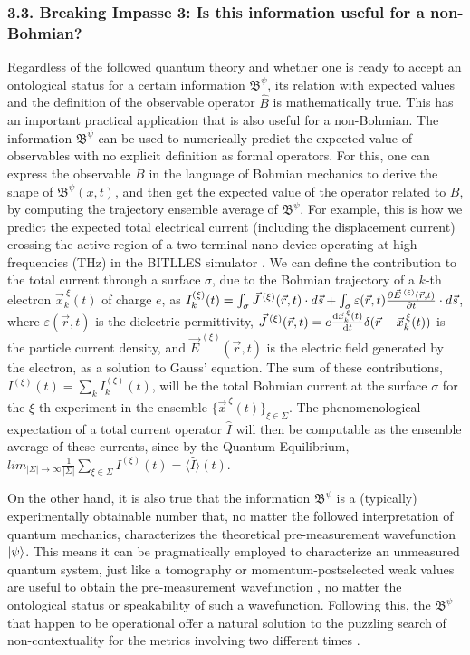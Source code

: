 \documentclass[11pt, a4paper]{article} %
\newcommand{\B}{\mathfrak{B}}
\begin{document}
\subsubsection*{3.3. Breaking Impasse 3: Is this information useful for a non-Bohmian?}
\vspace{-0.15cm}
Regardless of the followed quantum theory and whether one is ready to accept an ontological status for a certain information $\B^\psi$, its relation with expected values and the definition of the observable operator $\hat{B}$ is mathematically true. This has an important practical application that is also useful for a non-Bohmian. The information $\B^\psi$ can be used to numerically predict the expected value of observables with no explicit definition as formal operators. For this, one can express the observable $B$ in the language of Bohmian mechanics to derive the shape of $\B^\psi(x,t)$, and then get the expected value of the operator related to $B$, by computing the trajectory ensemble average of $\B^\psi$. For example, this is how we predict the expected total electrical current (including the displacement current) crossing the active region of a two-terminal nano-device operating at high frequencies (THz) in the BITLLES simulator \cite{equiv, Pel}. We can define the contribution to the total current through a surface $\sigma$, due to the Bohmian trajectory of a $k$-th electron $\vec{x}_k^{\:\xi}(t)$ of charge $e$, as $I_k^{(\xi)}(t)=\int_\sigma \vec{J}^{\:(\xi)}(\vec{r},t)\cdot d\vec{s}+\int_\sigma \varepsilon(\vec{r},t)\pdv{\vec{E}^{\:(\xi)}(\vec{r},t)}{t}\cdot d\vec{s}$, where $\varepsilon(\vec{r},t)$ is the dielectric permittivity, $\vec{J}^{\:(\xi)}(\vec{r},t)=e\dv{\vec{x}_k^{\:\xi}(t)}{t}\delta(\vec{r}-\vec{x}_k^{\:\xi}(t))$ is the particle current density, and $\vec{E}^{\:(\xi)}(\vec{r},t)$ is the electric field generated by the electron, as a solution to Gauss' equation. The sum of these contributions, $I^{(\xi)}(t)=\sum_k I^{(\xi)}_k(t)$, will be the total Bohmian current at the surface $\sigma$ for the $\xi$-th experiment in the ensemble $\{\vec{x}^{\:\xi}(t)\}_{\xi\in \Sigma}$. The phenomenological expectation of a total current operator $\hat{I}$ will then be computable as the ensemble average of these currents, since by the Quantum Equilibrium, $lim_{|\Sigma|\rightarrow \infty}\frac{1}{|\Sigma|} \sum_{\xi\in\Sigma} I^{(\xi)}(t)=\langle \hat{I}\rangle(t)$.

On the other hand, it is also true that the information $\B^\psi$ is a (typically) experimentally obtainable number that, no matter the followed interpretation of quantum mechanics, characterizes the theoretical pre-measurement wavefunction $\ket{\psi}$. This means it can be pragmatically employed to characterize an unmeasured quantum system, just like a tomography or momentum-postselected weak values are useful to obtain the pre-measurement wavefunction \cite{directWF}, no matter the ontological status or speakability of such a wavefunction. Following this, the $\B^\psi$ that happen to be operational offer a natural solution to the puzzling search of non-contextuality for the metrics involving two different times \cite{DevInPosition1}.
\end{document}
